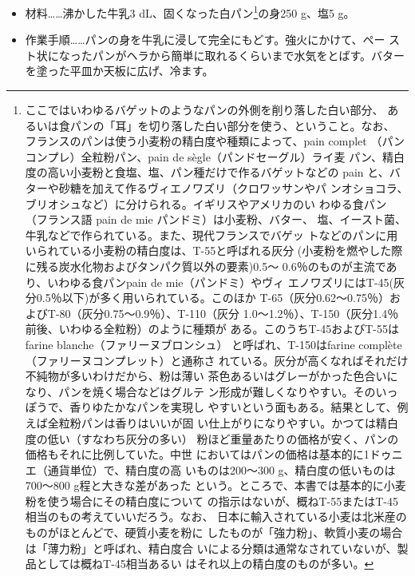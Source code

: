 \begin{recette}
\begin{itemize}
\item
  材料\ldots{}\ldots{}沸かした牛乳3 dL、固くなった白パン\footnote{ここではいわゆるバゲットのようなパンの外側を削り落した白い部分、
    あるいは食パンの「耳」を切り落した白い部分を使う、ということ。なお、
    フランスのパンは使う小麦粉の精白度や種類によって、pain complet
    （パンコンプレ）全粒粉パン、pain de sègle（パンドセーグル）ライ麦
    パン、精白度の高い小麦粉と食塩、塩、パン種だけで作るバゲットなどの
    pain と、バターや砂糖を加えて作るヴィエノワズリ（クロワッサンやパ
    ンオショコラ、ブリオシュなど）に分けられる。イギリスやアメリカのい
    わゆる食パン（フランス語 pain de mie パンドミ）は小麦粉、バター、
    塩、イースト菌、牛乳などで作られている。また、現代フランスでバゲッ
    トなどのパンに用いられている小麦粉の精白度は、T-55と呼ばれる灰分
    (小麦粉を燃やした際に残る炭水化物およびタンパク質以外の要素)0.5〜
    0.6％のものが主流であり、いわゆる食パンpain de mie（パンドミ）やヴィ
    エノワズリにはT-45(灰分0.5％以下)が多く用いられている。このほか
    T-65（灰分0.62〜0.75％）およびT-80（灰分0.75〜0.9％）、T-110（灰分
    1.0〜1.2％）、T-150（灰分1.4％前後、いわゆる全粒粉）のように種類が
    ある。このうちT-45およびT-55はfarine blanche（ファリーヌブロンシュ）
    と呼ばれ、T-150はfarine complète（ファリーヌコンプレット）と通称さ
    れている。灰分が高くなればそれだけ不純物が多いわけだから、粉は薄い
    茶色あるいはグレーがかった色合いになり、パンを焼く場合などはグルテ
    ン形成が難しくなりやすい。そのいっぽうで、香りゆたかなパンを実現し
    やすいという面もある。結果として、例えば全粒粉パンは香りはいいが固
    い仕上がりになりやすい。かつては精白度の低い（すなわち灰分の多い）
    粉ほど重量あたりの価格が安く、パンの価格もそれに比例していた。中世
    においてはパンの価格は基本的に1ドゥニエ（通貨単位）で、精白度の高
    いものは200〜300 g、精白度の低いものは700〜800 g程と大きな差があった
    という。ところで、本書では基本的に小麦粉を使う場合にその精白度について
    の指示はないが、概ねT-55またはT-45相当のもの考えていいだろう。なお、
    日本に輸入されている小麦は北米産のものがほとんどで、硬質小麦を粉に
    したものが「強力粉」、軟質小麦の場合は「薄力粉」と呼ばれ、精白度合
    いによる分類は通常なされていないが、製品としては概ねT-45相当あるい
    はそれ以上の精白度のものが多い。}の身250 g、塩5 g。
\item
  作業手順\ldots{}\ldots{}パンの身を牛乳に浸して完全にもどす。強火にかけて、ペー
  スト状になったパンがヘラから簡単に取れるくらいまで水気をとばす。バター
  を塗った平皿か天板に広げ、冷ます。
\end{itemize}


\end{recette}
